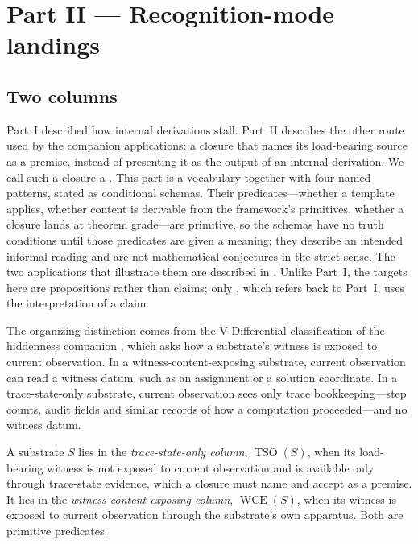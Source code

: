 \section{Part II --- Recognition-mode landings}\label{sec:recognition}

\subsection{Two columns}\label{sec:recognition:column-classification}

Part~I described how internal derivations stall.  Part~II describes the
other route used by the companion applications: a closure that names
its load-bearing source as a premise, instead of presenting it as the
output of an internal derivation.  We call such a closure a
\emph{\RML}.  This part is a vocabulary together with four named
patterns, stated as conditional schemas.  Their predicates---whether a
template applies, whether content is derivable from the framework's
primitives, whether a closure lands at theorem grade---are primitive, so
the schemas have no truth conditions until those predicates are given a
meaning; they describe an intended informal reading and are not
mathematical conjectures in the strict sense.  The two applications
that illustrate them are described in .  Unlike
Part~I, the targets here are propositions rather than claims; only
, which refers back to Part~I, uses the
interpretation of a claim.

The organizing distinction comes from the V-Differential classification
of the hiddenness companion \cite{Tsiokos2026CSL}, which asks how a
substrate's witness is exposed to current observation.  In a
witness-content-exposing substrate, current observation can read a
witness datum, such as an assignment or a solution coordinate.  In a
trace-state-only substrate, current observation sees only trace
bookkeeping---step counts, audit fields and similar records of how a
computation proceeded---and no witness datum.

\begin{definition}[Columns]\label{def:vdiff-tso-column}
A substrate \(S\) lies in the \emph{trace-state-only column},
\(\operatorname{TSO}(S)\), when its load-bearing witness is not exposed to
current observation and is available only through trace-state evidence,
which a closure must name and accept as a premise.  It lies in the
\emph{witness-content-exposing column}, \(\operatorname{WCE}(S)\), when its
witness is exposed to current observation through the substrate's own
apparatus.  Both are primitive predicates.
\end{definition}

